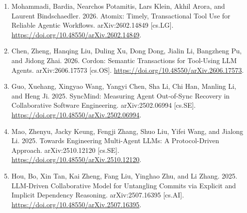 \documentclass[9pt,letterpaper]{extarticle}
\begin{document}
\begin{enumerate}
\item \label{ref:41} Mohammadi, Bardia, Nearchos Potamitis, Lars Klein, Akhil Arora, and Laurent Bindschaedler. 2026. {}Atomix: Timely, Transactional Tool Use for Reliable Agentic Workflows.{} arXiv:2602.14849 [cs.LG]. \url{https://doi.org/10.48550/arXiv.2602.14849}.
\item \label{ref:42} Chen, Zheng, Hanqing Liu, Duling Xu, Dong Dong, Jialin Li, Bangzheng Pu, and Jidong Zhai. 2026. {}Cordon: Semantic Transactions for Tool-Using LLM Agents.{} arXiv:2606.17573 [cs.OS]. \url{https://doi.org/10.48550/arXiv.2606.17573}.
\item \label{ref:43} Guo, Xuehang, Xingyao Wang, Yangyi Chen, Sha Li, Chi Han, Manling Li, and Heng Ji. 2025. {}SyncMind: Measuring Agent Out-of-Sync Recovery in Collaborative Software Engineering.{} arXiv:2502.06994 [cs.SE]. \url{https://doi.org/10.48550/arXiv.2502.06994}.
\item \label{ref:44} Mao, Zhenyu, Jacky Keung, Fengji Zhang, Shuo Liu, Yifei Wang, and Jialong Li. 2025. {}Towards Engineering Multi-Agent LLMs: A Protocol-Driven Approach.{} arXiv:2510.12120 [cs.SE]. \url{https://doi.org/10.48550/arXiv.2510.12120}.
\item \label{ref:45} Hou, Bo, Xin Tan, Kai Zheng, Fang Liu, Yinghao Zhu, and Li Zhang. 2025. {}LLM-Driven Collaborative Model for Untangling Commits via Explicit and Implicit Dependency Reasoning.{} arXiv:2507.16395 [cs.AI]. \url{https://doi.org/10.48550/arXiv.2507.16395}.
\end{enumerate}
\end{document}
